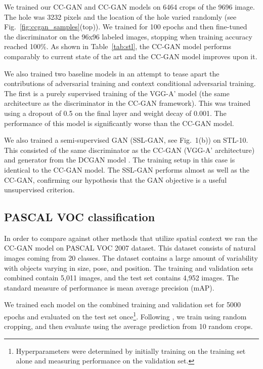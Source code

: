 \documentclass{article} \usepackage{iclr2017_conference,times}
\newcommand{\fig}[1]{Fig.~\ref{fig:#1}}
\newcommand{\tab}[1]{Table~\ref{tab:#1}}
\begin{document}
We trained our CC-GAN and CC-GAN models on 6464 crops of the 9696
image. The hole was 3232 pixels and the location of the hole
varied randomly (see \fig{ccgan_samples}(top)).  
We trained for 100 epochs and then 
fine-tuned the discriminator on the 96x96
labeled images, stopping when training accuracy reached 100\%. 
As shown in \tab{stl}, the CC-GAN model performs comparably to current state of the art \citep{dosovitskiy2014b} and the CC-GAN model improves upon it.

We also trained two baseline models in an attempt to tease apart the
contributions of adversarial training and context conditional
adversarial training.  The first is a purely supervised training of
the VGG-A' model (the same architecture as the discriminator in the
CC-GAN framework). This was trained using a dropout of 0.5 on the
final layer and weight decay of 0.001.  The performance of this model is significantly worse than the CC-GAN model.

We also trained a semi-supervised GAN (SSL-GAN, see Fig.~1(b)) on STL-10. This
consisted of the same discriminator as the CC-GAN (VGG-A'
architecture) and generator from the DCGAN model
\citep{radford2016}. The training setup in this case is identical to
the CC-GAN model. The SSL-GAN performs almost as well as the CC-GAN,
confirming our hypothesis that the GAN objective is a useful unsupervised criterion.


 


\subsection{PASCAL VOC classification}
In order to compare against other methods that utilize spatial context
we ran the CC-GAN model on PASCAL VOC 2007 dataset.  This dataset
consists of natural images coming from 20 classes.  The dataset
contains a large amount of variability with objects varying in size,
pose, and position.  The training and validation sets combined
contain 5,011 images, and the test set contains 4,952 images. The
standard measure of performance is mean average precision (mAP).

We trained each model on the combined training and validation set for
5000 epochs and evaluated on the test set
once\footnote{Hyperparameters were determined by initially training on
  the training set alone and measuring performance on the validation
  set.}. Following \cite{pathak2016}, we train using
random cropping, and then evaluate using the average prediction from
10 random crops.
\end{document}
